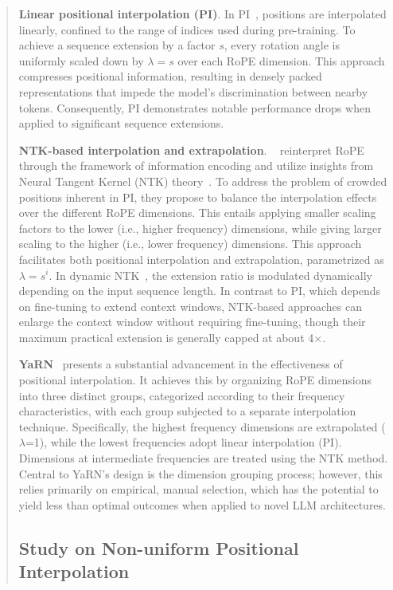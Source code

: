 \begin{abstract}
\textbf{Linear positional interpolation (PI)}. In PI~\cite{pi}, positions are interpolated linearly, confined to the range of indices used during pre-training. To achieve a sequence extension by a factor $s$, every rotation angle is uniformly scaled down by $\lambda = s$ over each RoPE dimension. This approach compresses positional information, resulting in densely packed representations that impede the model’s discrimination between nearby tokens. Consequently, PI demonstrates notable performance drops when applied to significant sequence extensions.

\textbf{NTK-based interpolation and extrapolation}. ~\cite{ntk,dynamicntk} reinterpret RoPE through the framework of information encoding and utilize insights from Neural Tangent Kernel (NTK) theory~\cite{jacot2018neural,tancik2020fourier}. To address the problem of crowded positions inherent in PI, they propose to balance the interpolation effects over the different RoPE dimensions. This entails applying smaller scaling factors to the lower (i.e., higher frequency) dimensions, while giving larger scaling to the higher (i.e., lower frequency) dimensions. This approach facilitates both positional interpolation and extrapolation, parametrized as $\lambda=s^{i}$. In dynamic NTK~\cite{dynamicntk}, the extension ratio is modulated dynamically depending on the input sequence length. In contrast to PI, which depends on fine-tuning to extend context windows, NTK-based approaches can enlarge the context window without requiring fine-tuning, though their maximum practical extension is generally capped at about 4$\times$.

\textbf{YaRN}~\cite{yarn} presents a substantial advancement in the effectiveness of positional interpolation. It achieves this by organizing RoPE dimensions into three distinct groups, categorized according to their frequency characteristics, with each group subjected to a separate interpolation technique. Specifically, the highest frequency dimensions are extrapolated ($\lambda$=1), while the lowest frequencies adopt linear interpolation (PI). Dimensions at intermediate frequencies are treated using the NTK method. Central to YaRN’s design is the dimension grouping process; however, this relies primarily on empirical, manual selection, which has the potential to yield less than optimal outcomes when applied to novel LLM architectures.

\subsection{Study on Non-uniform Positional Interpolation}


\end{abstract}
